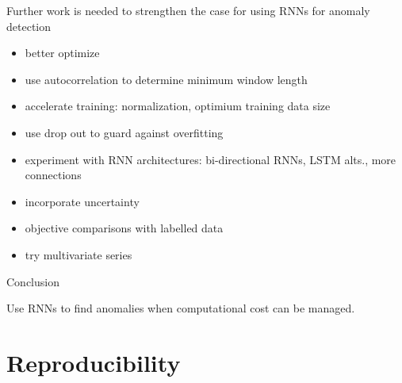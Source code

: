 \documentclass{beamer}
\begin{document}
    \begin{frame}{Further work is needed to strengthen the case for using RNNs for anomaly detection}
      \begin{itemize}
        \item better optimize
        \item use autocorrelation to determine minimum window length
        \item accelerate training: normalization, optimium training data size
        \item use drop out to guard against overfitting
        \item experiment with RNN architectures: bi-directional RNNs, LSTM alts., more connections
        \item incorporate uncertainty
        \item objective comparisons with labelled data
        \item try multivariate series
      \end{itemize}
        
    \end{frame}


    \begin{frame}{Conclusion}

      Use RNNs to find anomalies when computational cost can be managed.

    \end{frame}


    \section{Reproducibility}
\end{document}
